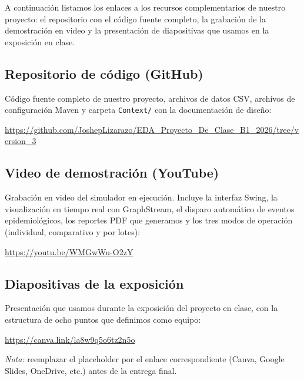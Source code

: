 \documentclass[spanish,notitlepage,letterpaper, 12pt]{article}
\begin{document}
A continuaci\'on listamos los enlaces a los recursos complementarios de nuestro proyecto: el repositorio con el c\'odigo fuente completo, la grabaci\'on de la demostraci\'on en video y la presentaci\'on de diapositivas que usamos en la exposici\'on en clase.

\subsection{Repositorio de c\'odigo (GitHub)}

C\'odigo fuente completo de nuestro proyecto, archivos de datos CSV, archivos de configuraci\'on Maven y carpeta \texttt{Context/} con la documentaci\'on de dise\~no:

\begin{center}
\url{https://github.com/JoshepLizarazo/EDA_Proyecto_De_Clase_B1_2026/tree/version_3}
\end{center}

\subsection{Video de demostraci\'on (YouTube)}

Grabaci\'on en video del simulador en ejecuci\'on. Incluye la interfaz Swing, la visualizaci\'on en tiempo real con GraphStream, el disparo autom\'atico de eventos epidemiol\'ogicos, los reportes PDF que generamos y los tres modos de operaci\'on (individual, comparativo y por lotes):

\begin{center}
\url{https://youtu.be/WMGwWu-O2zY}
\end{center}

\subsection{Diapositivas de la exposici\'on}

Presentaci\'on que usamos durante la exposici\'on del proyecto en clase, con la estructura de ocho puntos que definimos como equipo:

\begin{center}
\url{https://canva.link/la8w9q5o6tz2n5o}
\end{center}

\noindent\textit{Nota:} reemplazar el placeholder por el enlace correspondiente (Canva, Google Slides, OneDrive, etc.) antes de la entrega final.

\newpage
\end{document}
